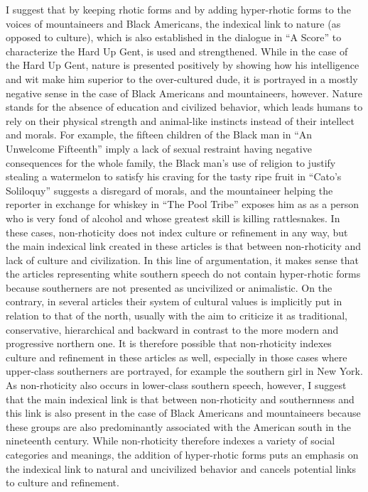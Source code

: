 I suggest that by keeping rhotic forms and by adding hyper-rhotic forms to the voices of mountaineers and Black Americans, the indexical link to nature (as opposed to culture), which is also established in the dialogue in “A Score” to characterize the Hard Up Gent, is used and strengthened. While in the case of the Hard Up Gent, nature is presented positively by showing how his intelligence and wit make him superior to the over-cultured dude, it is portrayed in a mostly negative sense in the case of Black Americans and mountaineers, however. Nature stands for the absence of education and civilized behavior, which leads humans to rely on their physical strength and animal-like instincts instead of their intellect and morals. For example, the fifteen children of the Black man in “An Unwelcome Fifteenth” imply a lack of sexual restraint having negative consequences for the whole family, the Black man’s use of religion to justify stealing a watermelon to satisfy his craving for the tasty ripe fruit in “Cato’s Soliloquy” suggests a disregard of morals, and the mountaineer helping the reporter in exchange for whiskey in “The Pool Tribe” exposes him as as a person who is very fond of alcohol and whose greatest skill is killing rattlesnakes. In these cases, non-rhoticity does not index culture or refinement in any way, but the main indexical link created in these articles is that between non-rhoticity and lack of culture and civilization. In this line of argumentation, it makes sense that the articles representing white southern speech do not contain hyper-rhotic forms because southerners are not presented as uncivilized or animalistic. On the contrary, in several articles their system of cultural values is implicitly put in relation to that of the north, usually with the aim to criticize it as traditional, conservative, hierarchical and backward in contrast to the more modern and progressive northern one. It is therefore possible that non-rhoticity indexes culture and refinement in these articles as well, especially in those cases where upper-class southerners are portrayed, for example the southern girl in New York. As non-rhoticity also occurs in lower-class southern speech, however, I suggest that the main indexical link is that between non-rhoticity and southernness and this link is also present in the case of Black Americans and mountaineers because these groups are also predominantly associated with the American south in the nineteenth century. While non-rhoticity therefore indexes a variety of social categories and meanings, the addition of hyper-rhotic forms puts an emphasis on the indexical link to natural and uncivilized behavior and cancels potential links to culture and refinement.


